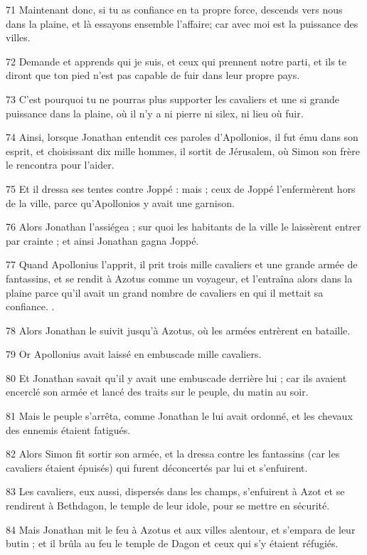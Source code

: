 \par 71 Maintenant donc, si tu as confiance en ta propre force, descends vers nous dans la plaine, et là essayons ensemble l'affaire; car avec moi est la puissance des villes.
\par 72 Demande et apprends qui je suis, et ceux qui prennent notre parti, et ils te diront que ton pied n'est pas capable de fuir dans leur propre pays.
\par 73 C'est pourquoi tu ne pourras plus supporter les cavaliers et une si grande puissance dans la plaine, où il n'y a ni pierre ni silex, ni lieu où fuir.
\par 74 Ainsi, lorsque Jonathan entendit ces paroles d'Apollonios, il fut ému dans son esprit, et choisissant dix mille hommes, il sortit de Jérusalem, où Simon son frère le rencontra pour l'aider.
\par 75 Et il dressa ses tentes contre Joppé : mais ; ceux de Joppé l'enfermèrent hors de la ville, parce qu'Apollonios y avait une garnison.
\par 76 Alors Jonathan l'assiégea ; sur quoi les habitants de la ville le laissèrent entrer par crainte ; et ainsi Jonathan gagna Joppé.
\par 77 Quand Apollonius l'apprit, il prit trois mille cavaliers et une grande armée de fantassins, et se rendit à Azotus comme un voyageur, et l'entraîna alors dans la plaine parce qu'il avait un grand nombre de cavaliers en qui il mettait sa confiance. .
\par 78 Alors Jonathan le suivit jusqu'à Azotus, où les armées entrèrent en bataille.
\par 79 Or Apollonius avait laissé en embuscade mille cavaliers.
\par 80 Et Jonathan savait qu'il y avait une embuscade derrière lui ; car ils avaient encerclé son armée et lancé des traits sur le peuple, du matin au soir.
\par 81 Mais le peuple s'arrêta, comme Jonathan le lui avait ordonné, et les chevaux des ennemis étaient fatigués.
\par 82 Alors Simon fit sortir son armée, et la dressa contre les fantassins (car les cavaliers étaient épuisés) qui furent déconcertés par lui et s'enfuirent.
\par 83 Les cavaliers, eux aussi, dispersés dans les champs, s'enfuirent à Azot et se rendirent à Bethdagon, le temple de leur idole, pour se mettre en sécurité.
\par 84 Mais Jonathan mit le feu à Azotus et aux villes alentour, et s'empara de leur butin ; et il brûla au feu le temple de Dagon et ceux qui s'y étaient réfugiés.
